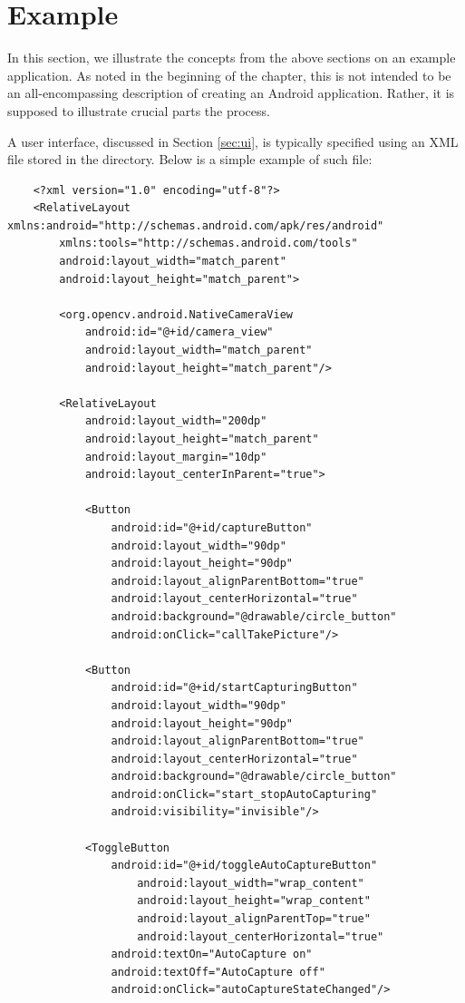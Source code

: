 \section{Example} 

In this section, we illustrate the concepts from the above sections on an example application. 
As noted in the beginning of the chapter, this is not intended to be an all-encompassing description of creating an Android application. 
Rather, it is supposed to illustrate crucial parts the process. 

A user interface, discussed in Section \ref{sec:ui}, is typically specified using an XML file stored in the  directory.
Below is a simple example of such file: 

\begin{lstlisting}
    <?xml version="1.0" encoding="utf-8"?>
    <RelativeLayout xmlns:android="http://schemas.android.com/apk/res/android"
        xmlns:tools="http://schemas.android.com/tools"
        android:layout_width="match_parent"
        android:layout_height="match_parent">
    
        <org.opencv.android.NativeCameraView
            android:id="@+id/camera_view"
            android:layout_width="match_parent"
            android:layout_height="match_parent"/>
        
        <RelativeLayout
    	    android:layout_width="200dp"
    	    android:layout_height="match_parent"
    	    android:layout_margin="10dp"
    	    android:layout_centerInParent="true">
    	    
            <Button
    	        android:id="@+id/captureButton"
    	        android:layout_width="90dp"
    	        android:layout_height="90dp"
    	        android:layout_alignParentBottom="true"
    	        android:layout_centerHorizontal="true"
    	        android:background="@drawable/circle_button"
    	        android:onClick="callTakePicture"/>
            
            <Button
    	        android:id="@+id/startCapturingButton"
    	        android:layout_width="90dp"
    	        android:layout_height="90dp"
    	        android:layout_alignParentBottom="true"
    	        android:layout_centerHorizontal="true"
    	        android:background="@drawable/circle_button"
    	        android:onClick="start_stopAutoCapturing"
    	        android:visibility="invisible"/>
    	          
    	    <ToggleButton
    	        android:id="@+id/toggleAutoCaptureButton"
                    android:layout_width="wrap_content" 
                    android:layout_height="wrap_content" 
                    android:layout_alignParentTop="true"
                    android:layout_centerHorizontal="true"
    	        android:textOn="AutoCapture on"
    	        android:textOff="AutoCapture off"	    
    	        android:onClick="autoCaptureStateChanged"/>
    

\end{lstlisting}
